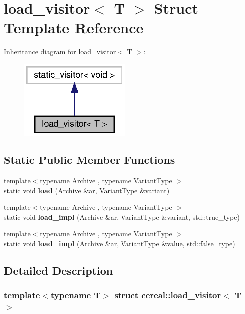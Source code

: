 \section{load\+\_\+visitor$<$ T $>$ Struct Template Reference}
\label{structcereal_1_1load__visitor}


Inheritance diagram for load\+\_\+visitor$<$ T $>$\+:
\nopagebreak
\begin{figure}[H]
\begin{center}
\leavevmode
\includegraphics[width=152pt]{structcereal_1_1load__visitor__inherit__graph}
\end{center}
\end{figure}
\subsection*{Static Public Member Functions}
\begin{DoxyCompactItemize}
\item 
{\footnotesize template$<$typename Archive , typename Variant\+Type $>$ }\\static void \textbf{ load} (Archive \&ar, Variant\+Type \&variant)
\item 
{\footnotesize template$<$typename Archive , typename Variant\+Type $>$ }\\static void \textbf{ load\+\_\+impl} (Archive \&ar, Variant\+Type \&variant, std\+::true\+\_\+type)
\item 
{\footnotesize template$<$typename Archive , typename Variant\+Type $>$ }\\static void \textbf{ load\+\_\+impl} (Archive \&ar, Variant\+Type \&value, std\+::false\+\_\+type)
\end{DoxyCompactItemize}


\subsection{Detailed Description}
\subsubsection*{template$<$typename T$>$\newline
struct cereal\+::load\+\_\+visitor$<$ T $>$}



